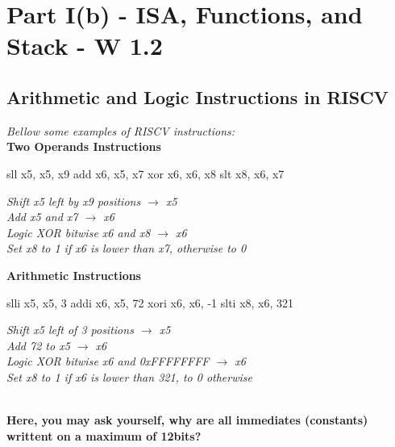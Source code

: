 \chapter{Part I(b) - ISA, Functions, and Stack - W 1.2}
\section{Arithmetic and Logic Instructions in RISCV}
\textit{Bellow some examples of RISCV instructions:} \\
\textbf{Two Operands Instructions} \\
\vspace*{10px}
\begin{minipage}{0.4\textwidth}
\begin{assembly}
sll  x5, x5, x9
add  x6, x5, x7
xor  x6, x6, x8
slt  x8, x6, x7
\end{assembly}
\end{minipage}%
\hfill
\vline
\hfill
\begin{minipage}{0.5\textwidth}
\small
\textit{Shift x5 left by x9 positions $\rightarrow$ x5} \\
\textit{Add x5 and x7 $\rightarrow$ x6} \\
\textit{Logic XOR bitwise x6 and x8 $\rightarrow$ x6} \\
\textit{Set x8 to 1 if x6 is lower than x7, otherwise to 0}
\end{minipage}

\textbf{Arithmetic Instructions} \\
\vspace*{10px}
\begin{minipage}{0.4\textwidth}
\begin{assembly}
slli x5, x5, 3
addi x6, x5, 72
xori x6, x6, -1
slti x8, x6, 321
\end{assembly}
\end{minipage}%
\hfill
\vline
\hfill
\begin{minipage}{0.5\textwidth}
\small
\textit{Shift x5 left of 3 positions $\rightarrow$ x5} \\
\textit{Add 72 to x5 $\rightarrow$ x6} \\
\textit{Logic XOR bitwise x6 and 0xFFFFFFFF $\rightarrow$ x6} \\
\textit{Set x8 to 1 if x6 is lower than 321, to 0 otherwise} \\
\end{minipage} \\
\textbf{Here, you may ask yourself, why are all immediates (constants) writtent on a maximum of 12bits?} \\
